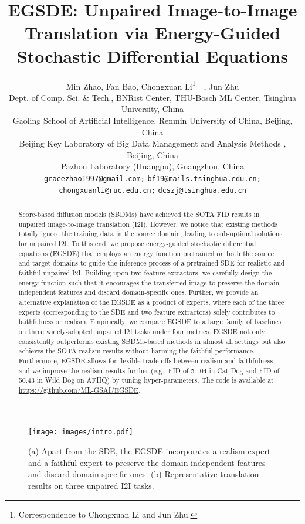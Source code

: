 \documentclass{article}
\title{EGSDE: Unpaired Image-to-Image Translation via Energy-Guided Stochastic Differential Equations}
\author{Min Zhao, Fan Bao, Chongxuan Li\thanks{Correspondence to Chongxuan Li and Jun Zhu.}~~, Jun Zhu\\
  Dept. of Comp. Sci. \& Tech., BNRist Center, THU-Bosch ML Center,
  Tsinghua University, China \\
   Gaoling School of Artificial Intelligence, Renmin University of China, Beijing, China\\
   Beijing Key Laboratory of Big Data Management and Analysis Methods , Beijing, China\\
   Pazhou Laboratory (Huangpu), Guangzhou, China \\
  \texttt{gracezhao1997@gmail.com;} \texttt{bf19@mails.tsinghua.edu.cn;} \\
  \texttt{chongxuanli@ruc.edu.cn;} \texttt{dcszj@tsinghua.edu.cn} 
}
\begin{document}
\maketitle







\begin{abstract}
Score-based diffusion models (SBDMs) have achieved the SOTA FID results in unpaired image-to-image translation (I2I). However, we notice that existing methods totally ignore the training data in the source domain, leading to sub-optimal solutions for unpaired I2I. 
To this end, we propose energy-guided stochastic differential equations (EGSDE)
that employs an energy function pretrained on both the source and target domains to guide the inference process of a pretrained SDE for realistic and faithful unpaired I2I. Building upon two feature extractors, we carefully design the energy function such that it encourages the transferred image to preserve the domain-independent features and discard domain-specific ones. Further, we provide an alternative explanation of the EGSDE as a product of experts, where each of the three experts (corresponding to the SDE and two feature extractors) solely contributes to faithfulness or realism. Empirically, we compare EGSDE to a large family of baselines on three widely-adopted unpaired I2I tasks under four metrics. EGSDE not only consistently outperforms existing SBDMs-based methods in almost all settings but also achieves the SOTA realism results without harming the faithful performance. Furthermore, EGSDE allows for flexible trade-offs between realism and faithfulness and we improve the realism results further (e.g., FID of 51.04 in Cat  Dog and FID of 50.43 in Wild  Dog on AFHQ) by tuning hyper-parameters. The code is available at \href{https://github.com/ML-GSAI/EGSDE}{https://github.com/ML-GSAI/EGSDE}.   
\end{abstract}
\begin{figure}
  \centering
  \texttt{[image: images/intro.pdf]}
  \caption{(a) Apart from the SDE, the EGSDE incorporates a realism expert and a faithful expert to preserve the domain-independent features and discard domain-specific ones. (b) Representative translation results on three unpaired I2I tasks.}
  \label{fig:intro}
  \vspace{-0.5cm}
\end{figure}

 
 
\end{document}

